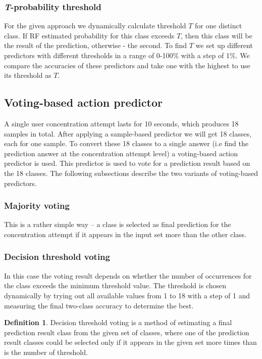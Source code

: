 \documentclass[12pt]{article}
\theoremstyle{definition}
\newtheorem{definition}{Definition}[section]
\begin{document}
\subsubsection{\textit{T}-probability threshold}
For the given approach we dynamically calculate threshold $T$ for one distinct class. If RF estimated probability for this class exceeds $T$, then this class will be the result of the prediction, otherwise - the second. To find $T$ we set up different predictors with different thresholds in a range of 0-100\% with a step of 1\%. We compare the accuracies of these predictors and take one with the highest to use its threshold as $T$.

\subsection{Voting-based action predictor}
A single user concentration attempt lasts for 10 seconds, which produces 18 samples in total. After applying a sample-based predictor we will get 18 classes, each for one sample. To convert these 18 classes to a single answer (i.e find the prediction answer at the concentration attempt level) a voting-based action predictor is used. This predictor is used to vote for a prediction result based on the 18 classes. The following subsections describe the two variants of voting-based predictors.

\subsubsection{Majority voting}

This is a rather simple way -- a class is selected as final prediction for the concentration attempt if it appears in the input set more than the other class. 

\subsubsection{Decision threshold voting}
In this case the voting result depends on whether the number of occurrences for the class exceeds the minimum threshold value. The threshold is chosen dynamically by trying out all available values from 1 to 18 with a step of 1 and measuring the final two-class accuracy to determine the best. 

\theoremstyle{definition}
\begin{definition}
Decision threshold voting is a method of estimating a final prediction result class from the given set of classes, where one of the prediction result classes could be selected only if it appears in the given set more times than is the number of threshold.
\end{definition}
\end{document}
